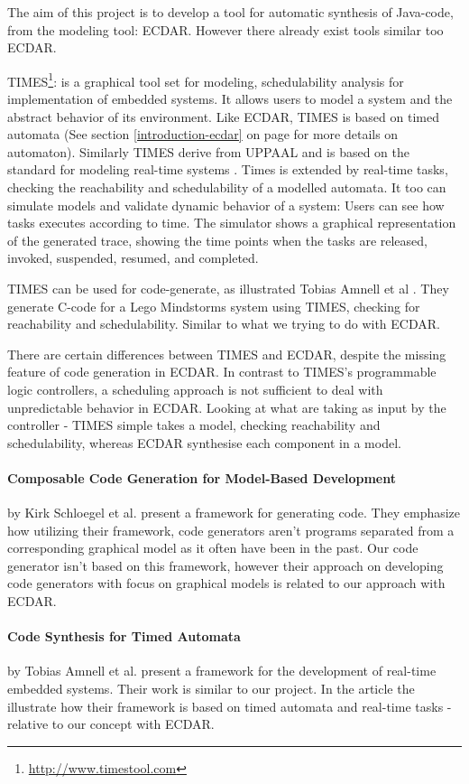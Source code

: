 The aim of this project is to develop a tool for automatic synthesis of Java-code, from the modeling tool: ECDAR. However there already exist tools similar too ECDAR.

TIMES\footnote{\url{http://www.timestool.com}}: is a graphical tool set for modeling, schedulability analysis for implementation of embedded systems. It allows users to model a system and the abstract behavior of its environment. 
Like ECDAR, TIMES is based on timed automata (See section \ref{introduction-ecdar} on page \pageref{introduction-ecdar} for more details on automaton). Similarly TIMES derive from UPPAAL and is based on the standard for modeling real-time systems \cite{Alur1994:183}.
Times is extended by real-time tasks, checking the reachability and schedulability of a modelled automata. It too can simulate models and validate dynamic behavior of a system: Users can see how tasks executes according to time. The simulator shows a graphical representation of the generated trace, showing the time points when the tasks are released, invoked, suspended, resumed, and completed.

TIMES can be used for code-generate, as illustrated Tobias Amnell et al \cite{Amnell:2002:CST:779110.779112}. They generate C-code for a Lego Mindstorms system using TIMES, checking for reachability and schedulability. Similar to what we trying to do with ECDAR. 

There are certain differences between TIMES and ECDAR, despite the missing feature of code generation in ECDAR. In contrast to TIMES's programmable logic controllers, a scheduling approach is not sufficient to deal with unpredictable behavior in ECDAR.
Looking at what are taking as input by the controller - TIMES simple takes a model, checking reachability and schedulability, whereas ECDAR synthesise each component in a model.



\paragraph{Composable Code Generation for Model-Based Development}
by Kirk Schloegel et al. present a framework for generating
code\cite{composable-code-generation}. They emphasize how utilizing their
framework, code generators aren't programs separated from a corresponding
graphical model as it often have been in the past. Our code generator isn't
based on this framework, however their approach on developing code generators
with focus on graphical models is related to our approach with ECDAR.

\paragraph{Code Synthesis for Timed Automata}
by Tobias Amnell et al. present a framework for the development of real-time
embedded systems\cite{Amnell:2002:CST:779110.779112}. Their work is similar to
our project. In the article the illustrate how their framework is based on timed
automata and real-time tasks - relative to our concept with ECDAR.

